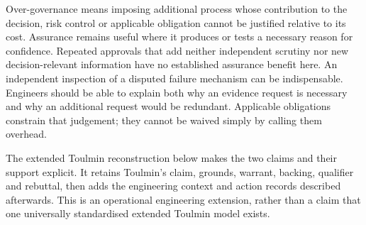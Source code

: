 \documentclass[11pt,a4paper]{article}
\begin{document}
Over-governance means imposing additional process whose contribution to the decision, risk control or applicable obligation cannot be justified relative to its cost. Assurance remains useful where it produces or tests a necessary reason for confidence. Repeated approvals that add neither independent scrutiny nor new decision-relevant information have no established assurance benefit here. An independent inspection of a disputed failure mechanism can be indispensable. Engineers should be able to explain both why an evidence request is necessary and why an additional request would be redundant. Applicable obligations constrain that judgement; they cannot be waived simply by calling them overhead.

The extended Toulmin reconstruction below makes the two claims and their support explicit. It retains Toulmin's claim, grounds, warrant, backing, qualifier and rebuttal, then adds the engineering context and action records described afterwards.\cite{toulmin} This is an operational engineering extension, rather than a claim that one universally standardised extended Toulmin model exists.
\end{document}
